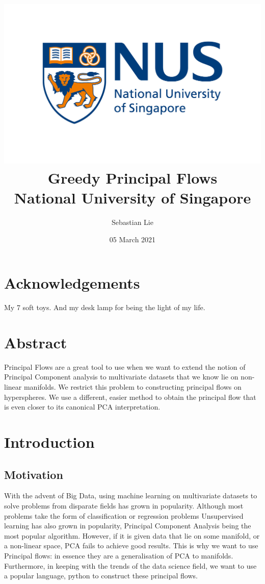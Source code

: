 \documentclass[12pt]{report}
\begin{document}
\title{
{\includegraphics[width=0.7\columnwidth]{university.jpg}}\\
{Greedy Principal Flows}\\
{\large National University of Singapore}\\
}
\author{Sebastian Lie}
\date{05 March 2021}
\maketitle

\chapter*{Acknowledgements}
My 7 soft toys. And my desk lamp for being the light of my life.

\chapter*{Abstract}
Principal Flows are a great tool to use when we want to extend the 
notion of Principal Component analysis to multivariate datasets that 
we know lie on non-linear manifolds. 
We restrict this problem to constructing principal flows on hyperspheres. 
We use a different, easier method to obtain the principal flow 
that is even closer to its canonical PCA interpretation. 

\newpage
\tableofcontents
\newpage

\chapter{Introduction}

\section{Motivation}

With the advent of Big Data, using machine learning on multivariate datasets 
to solve problems from disparate fields has grown in popularity. Although 
most problems take the form of classification or regression problems 
Unsupervised learning has also grown in popularity, 
Principal Component Analysis being the most popular algorithm. 
However, if it is given data that lie on some manifold, or a non-linear space, 
PCA fails to achieve good results. 
This is why we want to use Principal flows: 
in essence they are a generalisation of PCA to manifolds. 
Furthermore, in keeping with the trends of the data science field, 
we want to use a popular language, python to construct these principal flows.
\end{document}
